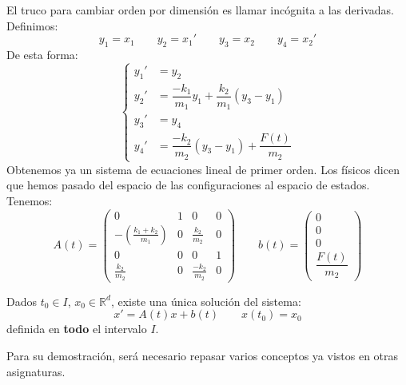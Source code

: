 \begin{ejemplo}
    \noindent
    El truco para cambiar orden por dimensión es llamar incógnita a las derivadas. Definimos:
    \begin{equation*}
        y_1 = x_1 \qquad y_2 = x_1' \qquad y_3 = x_2 \qquad y_4 = x_2'
    \end{equation*}
    De esta forma:
    \begin{equation*}
        \left\{\begin{array}{rl}
                y_1' &= y_2 \\
            y_2' &= \dfrac{-k_1}{m_1} y_1 + \dfrac{k_2}{m_1} (y_3-y_1) \\
            y_3' &= y_4 \\
            y_4' &= \dfrac{-k_2}{m_2}(y_3-y_1) + \dfrac{F(t)}{m_2}
        \end{array}\right.
    \end{equation*}
    Obtenemos ya un sistema de ecuaciones lineal de primer orden. Los físicos dicen que hemos pasado del espacio de las configuraciones al espacio de estados.\\

    Tenemos:
    \begin{equation*}
        A(t) = \left(\begin{array}{cccc}
                0 & 1 & 0 & 0 \\
                -\left(\frac{k_1+k_2}{m_1}\right) & 0 & \frac{k_2}{m_2} & 0 \\
                0 & 0 & 0 & 1 \\
                \frac{k_2}{m_2} & 0 & \frac{-k_2}{m_2} & 0
        \end{array}\right) \qquad b(t) = \left(\begin{array}{c}
            0 \\
            0 \\
            0 \\
            \dfrac{F(t)}{m_2}
        \end{array}\right)
    \end{equation*}
\end{ejemplo}

\begin{teo}\label{teo:existencia_unicidad_sistemas}
    Dados $t_0\in I$, $x_0\in \mathbb{R}^d$, existe una única solución del sistema:
    \begin{equation*}
        x' = A(t)x + b(t) \qquad x(t_0) = x_0
    \end{equation*}
    definida en \textbf{todo} el intervalo $I$.
\end{teo}
Para su demostración, será necesario repasar varios conceptos ya vistos en otras asignaturas.

